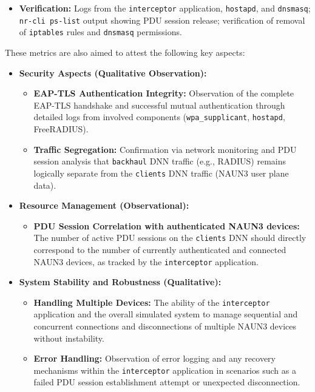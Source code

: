 \begin{enumerate}
{\begin{enumerate}
{\begin{itemize}
                    \item \textbf{Verification:} Logs from the \texttt{interceptor} application, \texttt{hostapd}, and \texttt{dnsmasq}; \texttt{nr-cli ps-list} output showing \ac{PDU} session release; verification of removal of \texttt{iptables} rules and \texttt{dnsmasq} permissions.
                \end{itemize}
            }
        \end{enumerate}
    }
\end{enumerate}

These metrics are also aimed to attest the following key aspects:

\begin{itemize}
    \item{
        \textbf{Security Aspects (Qualitative Observation):}
        \begin{itemize}
            \item \textbf{\ac{EAP-TLS} Authentication Integrity:} Observation of the complete \ac{EAP-TLS} handshake and successful mutual authentication through detailed logs from involved components (\texttt{wpa\_supplicant}, \texttt{hostapd}, FreeRADIUS).

            \item \textbf{Traffic Segregation:} Confirmation via network monitoring and \ac{PDU} session analysis that \texttt{backhaul} \ac{DNN} traffic (e.g., \ac{RADIUS}) remains logically separate from the \texttt{clients} \ac{DNN} traffic (\ac{NAUN3} user plane data).
        \end{itemize}
    }
    \item{
        \textbf{Resource Management (Observational):}
        \begin{itemize}
            \item \textbf{\ac{PDU} Session Correlation with authenticated \ac{NAUN3} devices:} The number of active \ac{PDU} sessions on the \texttt{clients} \ac{DNN} should directly correspond to the number of currently authenticated and connected \ac{NAUN3} devices, as tracked by the \texttt{interceptor} application.
        \end{itemize}
    }
    \item{
        \textbf{System Stability and Robustness (Qualitative):}
        \begin{itemize}
            \item \textbf{Handling Multiple Devices:} The ability of the \texttt{interceptor} application and the overall simulated system to manage sequential and concurrent connections and disconnections of multiple \ac{NAUN3} devices without instability.

            \item \textbf{Error Handling:} Observation of error logging and any recovery mechanisms within the \texttt{interceptor} application in scenarios such as a failed \ac{PDU} session establishment attempt or unexpected disconnection.
        \end{itemize}
    }
\end{itemize}

